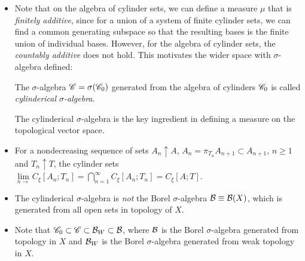 \documentclass[11pt]{article}
\begin{document}
\begin{itemize}
\item Note that on the algebra of cylinder sets, we can define a measure $\mu$ that is \emph{finitely additive}, since for a union of a system of finite cylinder sets, we can find a common generating subspace so that the resulting bases is the finite union of individual bases. However, for the algebra of cylinder sets, the \emph{countably additive} does not hold. This motivates the wider space with $\sigma$-algebra defined:

 \begin{definition}
 The $\sigma$-algebra ${\mathscr C} = \sigma({\mathscr C}_{0})$ generated from the algebra of cylinders ${\mathscr C}_{0}$ is called \emph{cylinderical $\sigma$-algebra}. 
 \end{definition}

The cylinderical $\sigma$-algebra is the key ingredient in defining a measure on the topological vector space.  

\item For a nondecreasing sequence of sets $A_{n}\uparrow A$, $A_{n}=  \pi_{T_{n}}A_{n+1} \subset A_{n+1}$, $n\ge 1$ and $T_{n}\uparrow T$, the cylinder sets $\lim\limits_{n\rightarrow}C_{\xi}[A_{n};T_{n}] = \bigcap_{n=1}^{\infty}C_{\xi}[A_{n};T_{n}] = C_{\xi}[A; T]$.  \\[10pt]

\item The cylinderical $\sigma$-algebra is \emph{not} the Borel $\sigma$-algebra ${\mathcal B}\equiv {\mathcal B}(X)$, which is generated from all open sets in topology of $X$.



\item Note that ${\mathscr C}_{0} \subset {\mathscr C} \subset {\mathcal B}_{W} \subset {\mathcal B}$, where ${\mathcal B}$ is the Borel $\sigma$-algebra generated from topology in $X$ and ${\mathcal B}_{W}$ is the Borel $\sigma$-algebra generated from weak topology in $X$.
\end{itemize}
\end{document}
